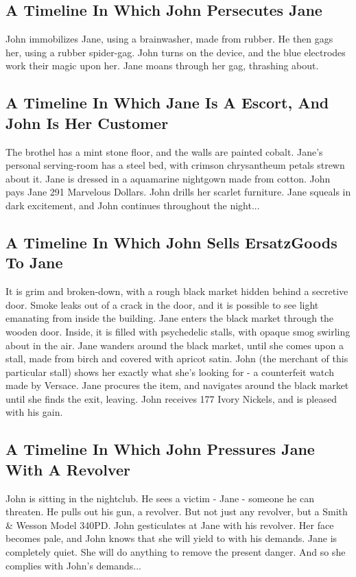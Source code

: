 \documentclass{article}
\begin{document}
\subsection{A Timeline In Which John Persecutes Jane}


John immobilizes Jane, using a brainwasher, made from rubber.
He then gags her, using a rubber spider{-}gag.
John turns on the device, and the blue electrodes work their magic upon her.
Jane moans through her gag, thrashing about.
\subsection{A Timeline In Which Jane Is A Escort, And John Is Her Customer}


The brothel has a mint stone floor, and the walls are painted cobalt.
Jane's personal serving{-}room has a steel bed, with crimson chrysantheum petals strewn about it.
Jane is dressed in a aquamarine nightgown made from cotton.
John pays Jane 291 Marvelous Dollars.
John drills her scarlet furniture.
Jane squeals in dark excitement, and John continues throughout the night...
\subsection{A Timeline In Which John Sells ErsatzGoods To Jane}


It is grim and broken{-}down, with a rough black market hidden behind a secretive door.
Smoke leaks out of a crack in the door, and it is possible to see light emanating from inside the building.
Jane enters the black market through the wooden door.
Inside, it is filled with psychedelic stalls, with opaque smog swirling about in the air.
Jane wanders around the black market, until she comes upon a stall, made from birch and covered with apricot satin.
John (the merchant of this particular stall) shows her exactly what she's looking for {-} a counterfeit watch made by Versace.
Jane procures the item, and navigates around the black market until she finds the exit, leaving.
John receives 177 Ivory Nickels, and is pleased with his gain.
\subsection{A Timeline In Which John Pressures Jane With A Revolver}


John is sitting in the nightclub.
He sees a victim {-} Jane {-} someone he can threaten. He pulls out his gun, a revolver.
But not just any revolver, but a Smith \& Wesson Model 340PD.
John gesticulates at Jane with his revolver. Her face becomes pale, and John knows that she will yield to with his demands.
Jane is completely quiet. She will do anything to remove the present danger. And so she complies with John's demands...
\end{document}
